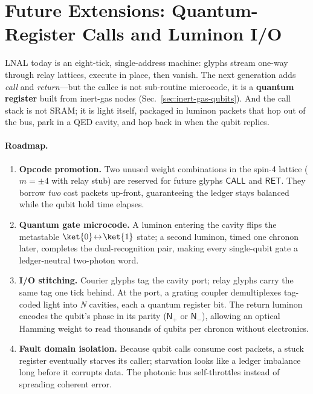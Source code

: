 \documentclass[11pt,oneside]{book}
\begin{document}
\section{Future Extensions: Quantum-Register Calls and Luminon I/O}
\label{sec:lnal-future}

LNAL today is an eight-tick, single-address machine:
glyphs stream one-way through relay lattices, execute in place, then
vanish. The next generation adds \emph{call} and \emph{return}—but the
callee is not sub-routine microcode, it is a \textbf{quantum register}
built from inert-gas nodes (Sec.~\ref{sec:inert-gas-qubits}).  
And the call stack is not SRAM; it is light itself, packaged in
luminon packets that hop out of the bus, park in a QED cavity, and hop
back in when the qubit replies.

\paragraph{Roadmap.}

\begin{enumerate}[label=\arabic*.,leftmargin=*,itemsep=4pt]
\item \textbf{Opcode promotion.}  
      Two unused weight combinations in the spin-4 lattice
      ($m=\pm4$ with relay stub) are reserved for future glyphs
      $\mathsf{CALL}$ and $\mathsf{RET}$.  
      They borrow \emph{two} cost packets up-front, guaranteeing the
      ledger stays balanced while the qubit hold time elapses.
\item \textbf{Quantum gate microcode.}  
      A luminon entering the cavity flips the metastable
      $\ket{0}\!\leftrightarrow\!\ket{1}$ state;  
      a second luminon, timed one chronon later, completes the 
      dual-recognition pair, making every single-qubit gate a
      ledger-neutral two-photon word.
\item \textbf{I/O stitching.}  
      Courier glyphs tag the cavity port;  
      relay glyphs carry the same tag one tick behind.  
      At the port, a grating coupler demultiplexes tag-coded light
      into \emph{N} cavities, each a quantum register bit.  
      The return luminon encodes the qubit’s phase in its parity
      ($\mathsf{N_{+}}$ or $\mathsf{N_{-}}$), allowing an optical
      Hamming weight to read thousands of qubits per chronon without
      electronics.
\item \textbf{Fault domain isolation.}  
      Because qubit calls consume cost packets, a stuck register
      eventually starves its caller;  
      starvation looks like a ledger imbalance long before it corrupts
      data. The photonic bus self-throttles instead of spreading
      coherent error.
\end{enumerate}
\end{document}
